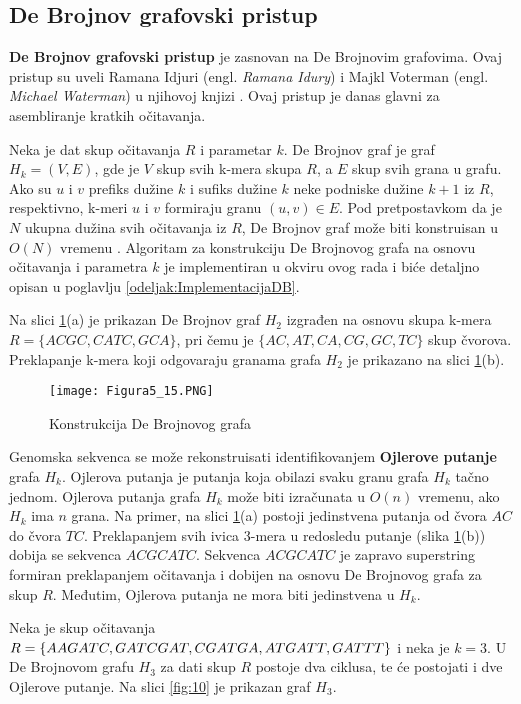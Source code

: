 \documentclass[12pt,oneside]{memoir}
\begin{document}
\subsection{De Brojnov grafovski pristup}
\label{odeljak:DeBrojnovGraf}

\textbf{De Brojnov grafovski pristup} je zasnovan na De Brojnovim grafovima. Ovaj pristup su uveli Ramana Idjuri (engl. \textit{Ramana Idury}) i Majkl Voterman (engl. \textit{Michael Waterman}) u njihovoj knjizi \cite{Voterman}. Ovaj pristup je danas glavni za asembliranje kratkih očitavanja.

Neka je dat skup očitavanja $R$ i parametar $k$. De Brojnov graf je graf $H_k = (V, E)$, gde je $V$ skup svih k-mera skupa $R$, a $E$ skup svih grana u grafu. Ako su $u$ i $v$ prefiks dužine $k$ i sufiks dužine $k$ neke podniske dužine $k + 1$ iz $R$, respektivno, k-meri $u$ i $v$ formiraju granu $(u, v) \in E$. Pod pretpostavkom da je $N$ ukupna dužina svih očitavanja iz $R$, De Brojnov graf može biti konstruisan u $O(N)$ vremenu \cite{WingKinSung}. Algoritam za konstrukciju De Brojnovog grafa na osnovu očitavanja i parametra $k$ je implementiran u okviru ovog rada i biće detaljno opisan u poglavlju \ref{odeljak:ImplementacijaDB}.

Na slici \ref{fig:9}(a) je prikazan De Brojnov graf $H_2$ izgrađen na osnovu skupa k-mera $R = \{ACGC, CATC, GCA\}$, pri čemu je $\{AC, AT, CA, CG, GC, TC\}$ skup čvorova. Preklapanje k-mera koji odgovaraju granama grafa $H_2$ je prikazano na slici \ref{fig:9}(b).

\begin{figure}[!ht]
\centering
\texttt{[image: Figura5\_15.PNG]}
\caption{Konstrukcija De Brojnovog grafa \cite{WingKinSung}}
 \label{fig:9}
 \end{figure}

Genomska sekvenca se može rekonstruisati identifikovanjem \textbf{Ojlerove putanje} grafa $H_k$. Ojlerova putanja je putanja koja obilazi svaku granu grafa $H_k$ tačno jednom. Ojlerova putanja grafa $H_k$ može biti izračunata u $O(n)$ vremenu, ako $H_k$ ima $n$ grana. Na primer, na slici \ref{fig:9}(a) postoji jedinstvena putanja od čvora $AC$ do čvora $TC$. Preklapanjem svih ivica 3-mera u redosledu putanje (slika \ref{fig:9}(b)) dobija se sekvenca $ACGCATC$. Sekvenca $ACGCATC$ je zapravo superstring formiran preklapanjem očitavanja i dobijen na osnovu De Brojnovog grafa za skup $R$. Međutim, Ojlerova putanja ne mora biti jedinstvena u $H_k$.

Neka je skup očitavanja $R = \{AAGATC, GATCGAT, CGATGA, ATGATT,\\ GATTT\}$ i neka je $k = 3$. U De Brojnovom grafu $H_3$ za dati skup $R$ postoje dva ciklusa, te će postojati i dve Ojlerove putanje. Na slici \ref{fig:10} je prikazan graf $H_3$.
\end{document}
